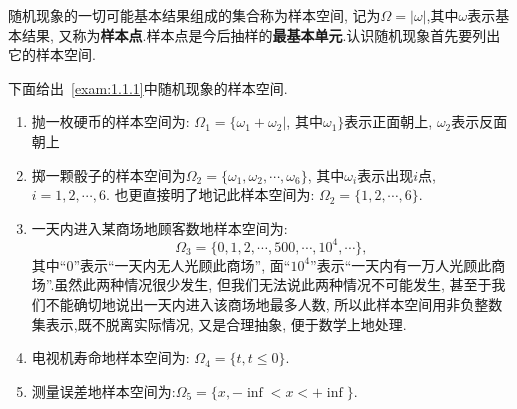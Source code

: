 随机现象的一切可能基本结果组成的集合称为样本空间, 记为$\Omega=|\omega|$,其中$\omega$表示基本结果, 又称为\textbf{样本点}.样本点是今后抽样的\textbf{最基本单元}.认识随机现象首先要列出它的样本空间.
	
\begin{example}
	
	下面给出~\ref{exam:1.1.1}中随机现象的样本空间.
	\begin{enumerate}
		\item 抛一枚硬币的样本空间为: $\Omega_1=\{\omega_{1}+\omega_{2}|$, 其中$\omega_{1}\}$表示正面朝上, $\omega_{2}$表示反面朝上
		\item 掷一颗骰子的样本空间为$ \Omega_{2}=\{\omega_{1},\omega_{2},\cdots,\omega_{6}\} $, 其中$ \omega_{i} $表示出现$ i $点, $ i=1,2,\cdots,6 $. 也更直接明了地记此样本空间为: $ \Omega_{2}=\{1,2,\cdots,6\} $.
		\item 一天内进入某商场地顾客数地样本空间为: 
		\[\Omega_{3}=\{0,1,2,\cdots,500,\cdots,10^4,\cdots\},\]
		其中“0”表示“一天内无人光顾此商场”, 面“$10^4$”表示“一天内有一万人光顾此商场”.虽然此两种情况很少发生, 但我们无法说此两种情况不可能发生, 甚至于我们不能确切地说出一天内进入该商场地最多人数, 所以此样本空间用非负整数集表示,既不脱离实际情况, 又是合理抽象, 便于数学上地处理.
		\item 电视机寿命地样本空间为: $ \Omega_{4}=\{t,t \leq 0\} $.
		\item 测量误差地样本空间为:$ \Omega_{5}=\{x,-\inf < x < +\inf\} $.
	\end{enumerate}
\end{example}   
